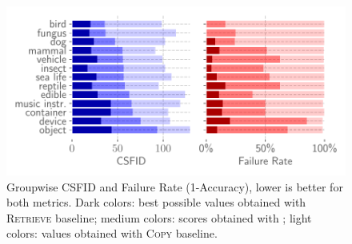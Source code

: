 \begin{table}[H]
    \centering
    \small
    \caption{Evaluation  of \ours and ManiGAN on ManiGAN evaluation protocol. They performed random edits on COCO (even if the edits are meaningless)
    and based their metrics off of their Image/Text encoders which were used for training. Despite this, we outperform ManiGAN on their evaluation protocol. %
    }
    \label{results_manigan}
    \end{table}
    



\begin{figure}[H]
    \hspace{-1.5cm}
    \includegraphics[width=1.2\linewidth]{images/flexit/assets/classwise.pdf}
    \caption{Groupwise CSFID  and Failure Rate (1-Accuracy),  lower is better for both metrics. 
    Dark colors: best possible values obtained with  \textsc{Retrieve} baseline; medium colors: scores obtained with \ours; light colors: values obtained with  \textsc{Copy} baseline. 
    }
\label{fig:classwise}
\end{figure}

